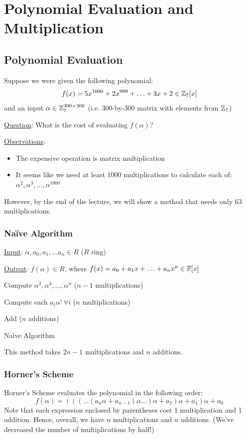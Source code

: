 
\section{Polynomial Evaluation and Multiplication}

\subsection{Polynomial Evaluation}
Suppose we were given the following polynomial:
\begin{equation*}
    f(x) = 5x^{1000} + 2x^{999} + \ldots + 3x +2 \in \operatorname{\mathbb{Z}}_7[x]
\end{equation*}
and an input $\alpha \in \operatorname{\mathbb{Z}}_7^{300 \times 300}$ (i.e. 300-by-300 matrix with elements from $\operatorname{\mathbb{Z}}_7$)

\ul{Question}: What is the cost of evaluating $f(\alpha)$?

\ul{Observations}:
\begin{itemize}
    \item The expensive operation is matrix multiplication
    \item It seems like we need at least 1000 multiplications to calculate each of: $\alpha^2, \alpha^3, \ldots, \alpha^{1000}$
\end{itemize}

However, by the end of the lecture, we will show a method that needs only $63$ multiplications.

\subsubsection{Naïve Algorithm}
\IncMargin{1em}
\begin{algorithm}[H]
    \ul{Input}: $\alpha, a_0, a_1, \ldots a_n \in R$ ($R$ ring)

    \ul{Output}: $f(\alpha) \in R$, where $f(x) = a_0 + a_1x + \ldots + a_nx^n \in \operatorname{\mathbb{F}}[x]$

    \BlankLine
    \nl Compute $\alpha^2, \alpha^3, \ldots, \alpha^n$ ($n - 1$ multiplications)

    \nl Compute each $a_i\alpha^i \ \forall i$ ($n$ multiplications)

    \nl Add ($n$ additions)
    \caption{Naïve Algorithm}
\end{algorithm}

This method takes $2n-1$ multiplications and $n$ additions.

\subsubsection{Horner's Scheme}
Horner's Scheme evaluates the polynomial in the following order:
\begin{equation}
    f(\alpha) = (((\ldots(a_n\alpha + a_{n-1})\alpha\ldots)\alpha + a_2)\alpha + a_1)\alpha + a_0
\end{equation}
Note that each expression enclosed by parentheses cost 1 multiplication and 1 addition.
Hence, overall, we have $n$ multiplications and $n$ additions.
(We've decreased the number of multiplications by half!)

